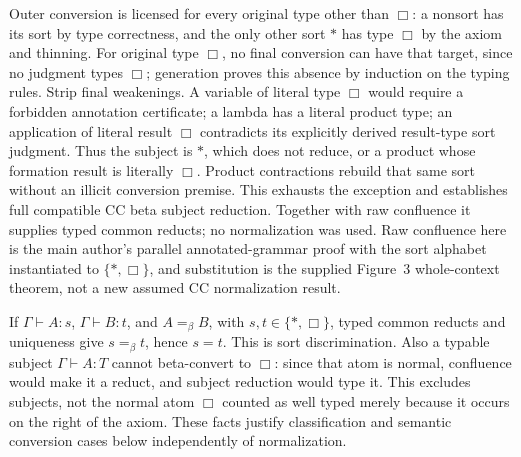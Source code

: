 Outer conversion is licensed for every original type other than
\(\Box\): a nonsort has its sort by type correctness, and the only
other sort \(\ast\) has type \(\Box\) by the axiom and thinning.
For original type \(\Box\), no final conversion can have that target,
since no judgment types \(\Box\); generation proves this absence by
induction on the typing rules. Strip final weakenings. A variable of
literal type \(\Box\) would require a forbidden annotation certificate;
a lambda has a literal product type; an application of literal result
\(\Box\) contradicts its explicitly derived result-type sort judgment.
Thus the subject is \(\ast\), which does not reduce, or a product whose
formation result is literally \(\Box\). Product contractions rebuild
that same sort without an illicit conversion premise. This exhausts the
exception and establishes full compatible CC beta subject reduction.
Together with raw confluence it supplies typed common reducts; no
normalization was used. Raw confluence here is the main author's
parallel annotated-grammar proof with the sort alphabet instantiated
to \(\{\ast,\Box\}\), and substitution is the supplied Figure~3
whole-context theorem, not a new assumed CC normalization result.

If \(\Gamma\vdash A:s\), \(\Gamma\vdash B:t\), and \(A=_\beta B\),
with \(s,t\in\{\ast,\Box\}\), typed common reducts and uniqueness
give \(s=_\beta t\), hence \(s=t\). This is sort discrimination.
Also a typable subject \(\Gamma\vdash A:T\) cannot beta-convert to
\(\Box\): since that atom is normal, confluence would make it a
reduct, and subject reduction would type it. This excludes subjects,
not the normal atom \(\Box\) counted as well typed merely because
it occurs on the right of the axiom. These facts justify classification and
semantic conversion cases below independently of normalization.


